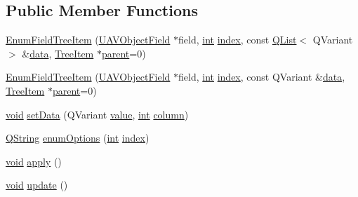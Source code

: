 \subsection*{Public Member Functions}
\begin{DoxyCompactItemize}
\item 
\hyperlink{group___u_a_v_object_browser_plugin_ga5f84bbb8e18a37ce79f64461e789f788}{Enum\-Field\-Tree\-Item} (\hyperlink{class_u_a_v_object_field}{U\-A\-V\-Object\-Field} $\ast$field, \hyperlink{ioapi_8h_a787fa3cf048117ba7123753c1e74fcd6}{int} \hyperlink{glext_8h_ab47dd9958bcadea08866b42bf358e95e}{index}, const \hyperlink{class_q_list}{Q\-List}$<$ Q\-Variant $>$ \&\hyperlink{glext_8h_a8850df0785e6fbcc2351af3b686b8c7a}{data}, \hyperlink{class_tree_item}{Tree\-Item} $\ast$\hyperlink{group___u_a_v_object_browser_plugin_gaa3a7ba624312b6be70872634db291881}{parent}=0)
\item 
\hyperlink{group___u_a_v_object_browser_plugin_ga15760edd8f3a9a12602e371c80ce41d7}{Enum\-Field\-Tree\-Item} (\hyperlink{class_u_a_v_object_field}{U\-A\-V\-Object\-Field} $\ast$field, \hyperlink{ioapi_8h_a787fa3cf048117ba7123753c1e74fcd6}{int} \hyperlink{glext_8h_ab47dd9958bcadea08866b42bf358e95e}{index}, const Q\-Variant \&\hyperlink{glext_8h_a8850df0785e6fbcc2351af3b686b8c7a}{data}, \hyperlink{class_tree_item}{Tree\-Item} $\ast$\hyperlink{group___u_a_v_object_browser_plugin_gaa3a7ba624312b6be70872634db291881}{parent}=0)
\item 
\hyperlink{group___u_a_v_objects_plugin_ga444cf2ff3f0ecbe028adce838d373f5c}{void} \hyperlink{group___u_a_v_object_browser_plugin_ga9b505163cede21ebe793e4f55f238591}{set\-Data} (Q\-Variant \hyperlink{glext_8h_aa0e2e9cea7f208d28acda0480144beb0}{value}, \hyperlink{ioapi_8h_a787fa3cf048117ba7123753c1e74fcd6}{int} \hyperlink{glext_8h_a3b58c39b1b7ca6f4012b27e84de3bdb3}{column})
\item 
\hyperlink{group___u_a_v_objects_plugin_gab9d252f49c333c94a72f97ce3105a32d}{Q\-String} \hyperlink{group___u_a_v_object_browser_plugin_ga8e27834043bde7967a644fdb2b6157f8}{enum\-Options} (\hyperlink{ioapi_8h_a787fa3cf048117ba7123753c1e74fcd6}{int} \hyperlink{glext_8h_ab47dd9958bcadea08866b42bf358e95e}{index})
\item 
\hyperlink{group___u_a_v_objects_plugin_ga444cf2ff3f0ecbe028adce838d373f5c}{void} \hyperlink{group___u_a_v_object_browser_plugin_ga28f3c98e391b2dc64c680f5f051b1c10}{apply} ()
\item 
\hyperlink{group___u_a_v_objects_plugin_ga444cf2ff3f0ecbe028adce838d373f5c}{void} \hyperlink{group___u_a_v_object_browser_plugin_ga3eb923fde33bef4803a779dd493e2947}{update} ()

\end{DoxyCompactItemize}
